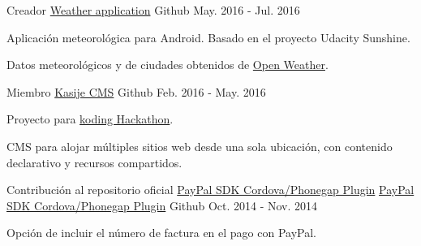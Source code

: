 \begin{cventries}
  \cventry
    {Creador} %
    {\faAndroid \hphantom{-} \href{https://github.com/miche-atucha/weatherer}{Weather application}} %
    {\faGithubSquare\acvHeaderIconSep Github} %
    {May. 2016 - Jul. 2016} %
    {
      \begin{cvitems} %
        \item {Aplicación meteorológica para Android. Basado en el proyecto Udacity Sunshine.}
        \item {Datos meteorológicos y de ciudades obtenidos de \href{https://openweathermap.org/}{Open Weather}.}
      \end{cvitems}
    }

  \cventry
    {Miembro} %
    {\href{https://github.com/touwolf/kasije}{Kasije CMS}} %
    {\faGithubSquare\acvHeaderIconSep Github} %
    {Feb. 2016 - May. 2016} %
    {
      \begin{cvitems} %
        \item {Proyecto para \href{https://www.koding.com/Hackathon}{koding Hackathon}.}
        \item {CMS para alojar múltiples sitios web desde una sola ubicación, con contenido declarativo y recursos compartidos.}
      \end{cvitems}
    }

  \cventry
    {Contribución al repositorio oficial \href{https://github.com/paypal/PayPal-Cordova-Plugin}{PayPal SDK Cordova/Phonegap Plugin}} %
    {\faPaypal \hphantom{-} \href{https://github.com/h4j4x/PayPal-Cordova-Plugin}{PayPal SDK Cordova/Phonegap Plugin}} %
    {\faGithubSquare\acvHeaderIconSep Github} %
    {Oct. 2014 - Nov. 2014} %
    {
      \begin{cvitems} %
        \item {Opción de incluir el número de factura en el pago con PayPal.}
      \end{cvitems}
    }

\end{cventries}
